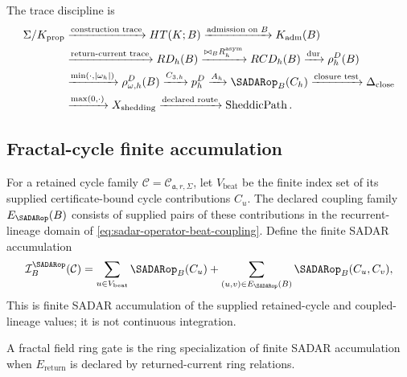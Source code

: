 The trace discipline is
\begin{equation}
\begin{aligned}
\Sigma/K_{\mathrm{prop}}
&\xrightarrow{\text{construction trace}}
HT(K;B)
\xrightarrow{\text{admission on }B}
K_{\mathrm{adm}}(B)\\
&\xrightarrow{\text{return-current trace}}
RD_h(B)
\xrightarrow{\bowtie_B R^{\mathrm{asym}}_h}
RCD_h(B)
\xrightarrow{\operatorname{dur}}
\rho_h^D(B)\\
&\xrightarrow{\min(\cdot,|\omega_h|)}
\rho^D_{\omega,h}(B)
\xrightarrow{C_{3,h}}
p_h^D
\xrightarrow{A_h}
\SADARop_B(C_h)
\xrightarrow{\text{closure test}}
\Delta_{\mathrm{close}}\\
&\xrightarrow{\max(0,\cdot)}
X_{\mathrm{shedding}}
\xrightarrow{\text{declared route}}
\operatorname{SheddicPath}.
\end{aligned}
\label{eq:support-trace-spine}
\end{equation}
\subsection{Fractal-cycle finite accumulation}
\label{subsec:fractal-cycle-finite-accumulation}
For a retained cycle family \(\mathcal C=\mathcal C_{\mathfrak a,r,\Sigma}\),
let \(V_{\mathrm{beat}}\) be the finite index set of its supplied certificate-bound cycle
contributions \(C_u\). The declared coupling family \(E_{\SADARop}(B)\)
consists of supplied pairs of these contributions in the recurrent-lineage
domain of \eqref{eq:sadar-operator-beat-coupling}. Define the finite SADAR
accumulation
\begin{equation}
\mathcal I^{\SADARop}_{B}(\mathcal C)
=
\sum_{u\in V_{\mathrm{beat}}}
\SADARop_B(C_u)
+
\sum_{(u,v)\in E_{\SADARop}(B)}
\SADARop_B(C_u,C_v),
\label{eq:fractal-cycle-finite-accumulation}
\end{equation}
This is finite SADAR accumulation of the supplied retained-cycle and
coupled-lineage values; it is not continuous integration.

A fractal field ring gate is the ring specialization of finite SADAR accumulation when \(E_{\mathrm{return}}\) is declared by returned-current ring relations.


